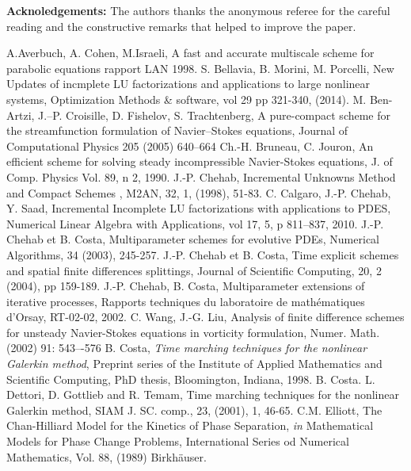 {{\bf Acknoledgements:} The authors thanks the anonymous referee for the careful reading and the constructive remarks that helped to improve the paper.
\begin{thebibliography}{99}
 A.Averbuch, A. Cohen, M.Israeli,
A fast and accurate multiscale scheme for parabolic equations
 rapport LAN 1998.
 S. Bellavia, B. Morini, M. Porcelli, New Updates of incmplete LU factorizations and applications to large nonlinear systems, Optimization Methods \& software, vol 29 pp 321-340, (2014).
 M. Ben-Artzi, J.--P. Croisille,
D. Fishelov,  S. Trachtenberg, A pure-compact scheme for the streamfunction formulation
of Navier–Stokes equations, Journal of Computational Physics 205 (2005) 640–664
 Ch.-H. Bruneau, C. Jouron,
An efficient scheme for solving steady incompressible Navier-Stokes equations,
J. of Comp. Physics Vol. 89, n 2, 1990.
 J.-P. Chehab, Incremental Unknowns Method and Compact Schemes , M2AN, 32, 1, (1998), 51-83.
 C. Calgaro, J.-P. Chehab, Y. Saad,
Incremental Incomplete LU factorizations with applications to PDES, Numerical Linear Algebra with Applications,
vol 17, 5, p 811--837, 2010.
  J.-P. Chehab et B. Costa, Multiparameter
schemes for evolutive PDEs, Numerical Algorithms, 34 (2003),
245-257.
  J.-P. Chehab et B. Costa,
Time explicit schemes and spatial finite differences splittings,
Journal of Scientific Computing, 20, 2 (2004), pp 159-189.
 J.-P. Chehab, B. Costa,
Multiparameter extensions of iterative processes, Rapports
techniques du laboratoire de math\'ematiques d'Orsay, RT-02-02,
2002.
 C. Wang, J.-G. Liu, Analysis of finite difference schemes for unsteady
Navier-Stokes equations in vorticity formulation, Numer. Math. (2002) 91: 543–-576
 B. Costa, {\it Time marching techniques for the
nonlinear Galerkin method}, Preprint series of the Institute of
Applied Mathematics and Scientific Computing, PhD thesis, 
Bloomington, Indiana, 1998.
 B. Costa. L. Dettori, D. Gottlieb and R. Temam,
Time marching techniques for the nonlinear Galerkin method, SIAM J.
SC. comp., 23, (2001), 1, 46-65.
 C.M. Elliott, The Chan-Hilliard Model for the Kinetics of Phase Separation, 
{\it in} Mathematical Models for Phase Change Problems, International Series od Numerical Mathematics, Vol. 88, (1989) Birkh\"auser.

\end{thebibliography}}

